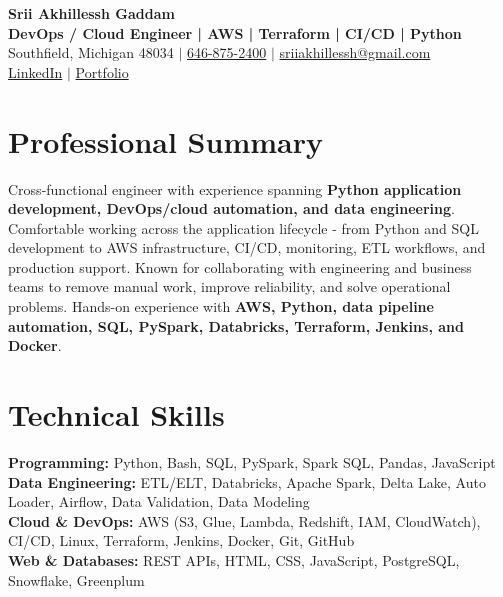 \documentclass[letterpaper,10pt]{article}
\begin{document}
\fontsize{9.35pt}{10.45pt}\selectfont

\begin{center}
    {\LARGE \textbf{Srii Akhillessh Gaddam}} \\[-1pt]
    \textbf{DevOps / Cloud Engineer | AWS | Terraform | CI/CD | Python} \\[2pt]
    Southfield, Michigan 48034 $|$
    \href{tel:6468752400}{646-875-2400} $|$
    \href{mailto:sriiakhillessh@gmail.com}{sriiakhillessh@gmail.com} \\[1pt]
    \href{https://www.linkedin.com/in/srii-akhiilessh-gaddam-b48668191/}{LinkedIn} $|$
    \href{https://sriiakhillesshg.github.io/portfolio/}{Portfolio}
\end{center}
\vspace{-8pt}

\section{Professional Summary}
\small{Cross-functional engineer with experience spanning \textbf{Python application development, DevOps/cloud automation, and data engineering}. Comfortable working across the application lifecycle - from Python and SQL development to AWS infrastructure, CI/CD, monitoring, ETL workflows, and production support. Known for collaborating with engineering and business teams to remove manual work, improve reliability, and solve operational problems. Hands-on experience with \textbf{AWS, Python, data pipeline automation, SQL, PySpark, Databricks, Terraform, Jenkins, and Docker}.}

\section{Technical Skills}
\small{
\textbf{Programming:} Python, Bash, SQL, PySpark, Spark SQL, Pandas, JavaScript \\
\textbf{Data Engineering:} ETL/ELT, Databricks, Apache Spark, Delta Lake, Auto Loader, Airflow, Data Validation, Data Modeling \\
\textbf{Cloud \& DevOps:} AWS (S3, Glue, Lambda, Redshift, IAM, CloudWatch), CI/CD, Linux, Terraform, Jenkins, Docker, Git, GitHub \\
\textbf{Web \& Databases:} REST APIs, HTML, CSS, JavaScript, PostgreSQL, Snowflake, Greenplum
}
\end{document}
